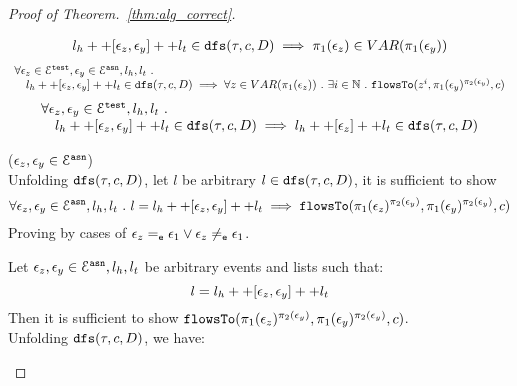 \begin{proof}[Proof of Theorem.~\ref{thm:alg_correct}]
\begin{case}
\begin{equation}
\begin{array}{l}
   l_h ++ [\mathtt{\epsilon}_z, \mathtt{\epsilon}_y] ++ l_t \in \mathtt{dfs}(\mathtt{\tau}, c, D)
  \implies \pi_1(\mathtt{\epsilon}_z) \in VAR(\pi_1(\mathtt{\epsilon}_y))
\end{array}
\end{equation}
%
\begin{equation}
\begin{array}{l}
  \forall \mathtt{\epsilon}_z \in \mathcal{E}^{\mathtt{{test}}}, \mathtt{\epsilon}_y \in \mathcal{E}^{\mathtt{{asn}}}, l_h, l_t ~.~
   \\ \quad 
   l_h ++ [\mathtt{\epsilon}_z, \mathtt{\epsilon}_y] ++ l_t \in \mathtt{dfs}(\mathtt{\tau}, c, D)
  \implies \forall z \in VAR(\pi_1(\mathtt{\epsilon}_z)) ~.~ \exists i \in\mathbb{N} ~.~
  \mathtt{flowsTo}(z^i, \pi_1(\mathtt{\epsilon}_y)^{\pi_2(\mathtt{\epsilon}_y)}, c)
\end{array}
\end{equation}
%
\begin{equation}
\begin{array}{l}
  \forall \mathtt{\epsilon}_z, \mathtt{\epsilon}_y \in \mathcal{E}^{\mathtt{{test}}}, l_h, l_t ~.~
   \\ \quad 
   l_h ++ [\mathtt{\epsilon}_z, \mathtt{\epsilon}_y] ++ l_t \in \mathtt{dfs}(\mathtt{\tau}, c, D)
  \implies l_h ++ [\mathtt{\epsilon}_z] ++ l_t \in \mathtt{dfs}(\mathtt{\tau}, c, D)
\end{array}
\end{equation}
%
\begin{subcase}($\mathtt{\epsilon}_z, \mathtt{\epsilon}_y \in \mathcal{E}^{\mathtt{{asn}}}$)
\\
Unfolding $\mathtt{dfs}(\mathtt{\tau}, c, D)$, let $l$ be arbitrary $l \in  \mathtt{dfs}(\mathtt{\tau}, c, D)$, it is sufficient to show 
\[
   \forall \mathtt{\epsilon}_z, \mathtt{\epsilon}_y \in \mathcal{E}^{\mathtt{{asn}}}, l_h, l_t ~.~ 
   l = l_h ++ [\mathtt{\epsilon}_z, \mathtt{\epsilon}_y] ++ l_t 
   \implies \mathtt{flowsTo}(\pi_1(\mathtt{\epsilon}_z)^{\pi_2(\mathtt{\epsilon}_y)}, \pi_1(\mathtt{\epsilon}_y)^{\pi_2(\mathtt{\epsilon}_y)}, c)
\] 
%
Proving by cases of $\mathtt{\epsilon}_z =_{\mathtt{e}} \mathtt{\epsilon}_1 \lor \mathtt{\epsilon}_z \neq_{\mathtt{e}} \mathtt{\epsilon}_1$.
\begin{subsubcase}
Let $\mathtt{\epsilon}_z, \mathtt{\epsilon}_y \in \mathcal{E}^{\mathtt{{asn}}}, l_h, l_t$ be arbitrary events and lists such that:
\[
  l = l_h ++ [\mathtt{\epsilon}_z, \mathtt{\epsilon}_y] ++ l_t 
\]
%
Then it is sufficient to show $\mathtt{flowsTo}(\pi_1(\mathtt{\epsilon}_z)^{\pi_2(\mathtt{\epsilon}_y)}, \pi_1(\mathtt{\epsilon}_y)^{\pi_2(\mathtt{\epsilon}_y)}, c)$.
\\
Unfolding $\mathtt{dfs}(\mathtt{\tau}, c, D)$, we have:
%

\end{subsubcase}
\end{subcase}
\end{case}
\end{proof}
